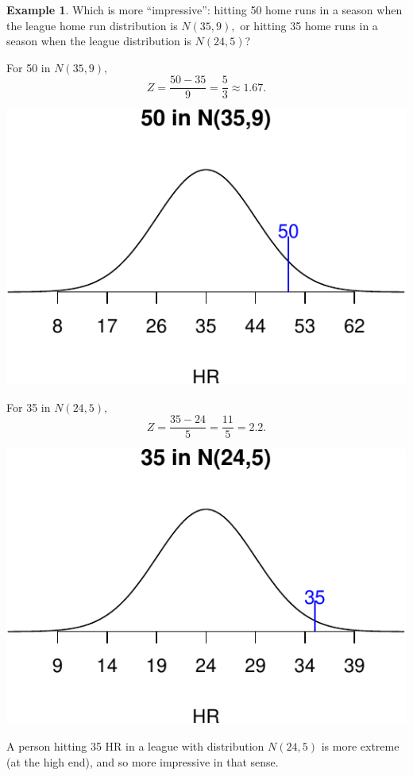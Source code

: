 \documentclass[
]{book}
\theoremstyle{definition}
\theoremstyle{definition}
\newtheorem{example}{Example}[chapter]
\theoremstyle{definition}
\theoremstyle{definition}
\theoremstyle{remark}
\begin{document}
\begin{example}
\protect\hypertarget{exm:comparing-values-with-z-scores}{}\label{exm:comparing-values-with-z-scores}Which is more ``impressive'': hitting 50 home runs in a season when the league home run distribution is \(N(35,9),\) or hitting 35 home runs in a season when the league distribution is \(N(24,5)\)?

For 50 in \(N(35,9),\) \[Z = \frac{50-35}{9} = \frac{5}{3} \approx 1.67.\]

\includegraphics{math340-notes_files/figure-latex/unnamed-chunk-18-1.pdf}

For 35 in \(N(24,5),\) \[Z = \frac{35-24}{5} = \frac{11}{5} = 2.2.\]

\includegraphics{math340-notes_files/figure-latex/unnamed-chunk-19-1.pdf}

A person hitting 35 HR in a league with distribution \(N(24,5)\) is more extreme (at the high end), and so more impressive in that sense.
\end{example}
\end{document}
